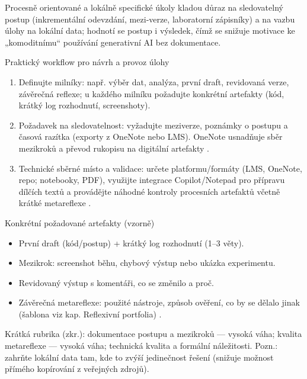 Procesně orientované a lokálně specifické úkoly kladou důraz na sledovatelný postup (inkrementální odevzdání, mezi‑verze, laboratorní zápisníky) a na vazbu úlohy na lokální data; hodnotí se postup i výsledek, čímž se snižuje motivace ke „komoditnímu“ používání generativní AI bez dokumentace.

Praktický workflow pro návrh a provoz úlohy
\begin{enumerate}
  \item Definujte milníky: např. výběr dat, analýza, první draft, revidovaná verze, závěrečná reflexe; u každého milníku požadujte konkrétní artefakty (kód, krátký log rozhodnutí, screenshoty).
  \item Požadavek na sledovatelnost: vyžadujte meziverze, poznámky o postupu a časová razítka (exporty z OneNote nebo LMS). OneNote usnadňuje sběr mezikroků a převod rukopisu na digitální artefakty \cite{kb_ai_101_tipu_pdf_04e4a115_page_8_1}.
  \item Technické sběrné místo a validace: určete platformu/formáty (LMS, OneNote, repo; notebooky, PDF), využijte integrace Copilot/Notepad pro přípravu dílčích textů a provádějte náhodné kontroly procesních artefaktů včetně krátké metareflexe \cite{kb_ai_101_tipu_pdf_04e4a115_page_14_1, kb_ai_101_tipu_pdf_04e4a115_page_8_1}.
\end{enumerate}

Konkrétní požadované artefakty (vzorně)
\begin{itemize}
  \item První draft (kód/postup) + krátký log rozhodnutí (1--3 věty).
  \item Mezikrok: screenshot běhu, chybový výstup nebo ukázka experimentu.
  \item Revidovaný výstup s komentáři, co se změnilo a proč.
  \item Závěrečná metareflexe: použité nástroje, způsob ověření, co by se dělalo jinak (šablona viz kap. Reflexivní portfolia) \cite{kb_ai_101_tipu_pdf_04e4a115_page_8_1}.
\end{itemize}

Krátká rubrika (zkr.): dokumentace postupu a mezikroků — vysoká váha; kvalita metareflexe — vysoká váha; technická kvalita a formální náležitosti. Pozn.: zahrňte lokální data tam, kde to zvýší jedinečnost řešení (snižuje možnost přímého kopírování z veřejných zdrojů).